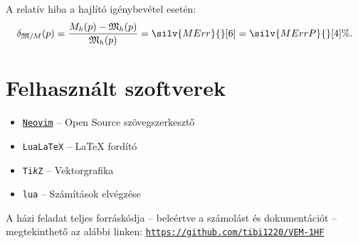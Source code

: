 \documentclass[a4paper, 12pt]{scrartcl}
\begin{document}
A relatív hiba a hajlító igénybevétel esetén:
\begin{equation}
  \delta_{\spec M/M}(p) 
  = \frac{M_h(p) - \spec M_h(p)}{\spec M_h(p)}
  = \silv{MErr}{}[6]
  = \silv{MErrP}{}[4] \%
  \text.
  \label{eq:M-rel}
\end{equation}

\clearpage
\tableofcontents

\vfill

\section*{Felhasznált szoftverek}

\begin{itemize}
  \item \href{https://neovim.io}{\texttt{Neovim}}
        \tabto{3.9cm} – \tabto{4.7cm}
        Open Source szövegszerkesztő

  \item \texttt{Lua\LaTeX}
        \tabto{3.9cm} – \tabto{4.7cm}
        \LaTeX{} fordító

  \item \texttt{Ti\textit{k}Z}
        \tabto{3.9cm} – \tabto{4.7cm}
        Vektorgrafika

  \item \texttt{lua}
        \tabto{3.9cm} – \tabto{4.7cm}
        Számítások elvégzése
\end{itemize}

A házi feladat teljes forráskódja -- beleértve a számolást és dokumentációt --
megtekinthető az alábbi linken:
\texttt{\href{https://github.com/tibi1220/VEM-1HF}{https://github.com/tibi1220/VEM-1HF}}
\end{document}
